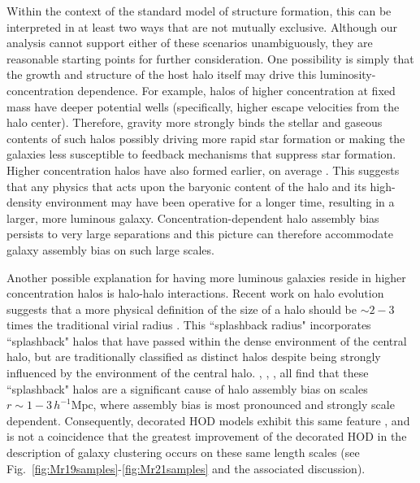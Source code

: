 \documentclass[usenatbib,usegraphicx,letterpaper]{mn2e}
\begin{document}
Within the context of the standard model of structure formation, this
can be interpreted in at least two ways that are not mutually
exclusive. Although our analysis cannot support either of these
scenarios unambiguously, they are reasonable starting points for
further consideration.  One possibility is simply that the growth and
structure of the host halo itself may drive this
luminosity-concentration dependence. For example, halos of higher
concentration at fixed mass have deeper potential wells (specifically,
higher escape velocities from the halo center).  Therefore, gravity
more strongly binds the stellar and gaseous contents of such halos
possibly driving more rapid star formation or making the galaxies less
susceptible to feedback mechanisms that suppress star
formation. Higher concentration halos have also formed earlier, on
average \citep[e.g.,][]{wechsler02}. This suggests that any physics
that acts upon the baryonic content of the halo and its high-density
environment may have been operative for a longer time, resulting in a
larger, more luminous galaxy.  Concentration-dependent halo assembly
bias persists to very large separations 
\citep[$r > 10\, h^{-1}\mathrm{Mpc}$, e.g.,][]{wechsler06} and this picture can
therefore accommodate galaxy assembly bias on such large scales.

Another possible explanation for having more luminous galaxies reside
in higher concentration halos is halo-halo interactions.  Recent work
on halo evolution suggests that a more physical definition of the size
of a halo should be $\sim 2-3$ times the traditional virial radius
\citep{wetzel_etal14,adhikari_etal14,wetzel_nagai15,more_etal15,sunayama_etal16}.
This ``splashback radius" incorporates ``splashback" halos that have
passed within the dense environment of the central halo, but are
traditionally classified as distinct halos despite being strongly
influenced by the environment of the central
halo. \citet{wang_etal09}, \citet{wetzel_etal14},
\citet{sunayama_etal16}, all find that these ``splashback" halos are a
significant cause of halo assembly bias on scales $r \sim 1-3\,
h^{-1}\mathrm{Mpc}$, where assembly bias is most pronounced and
strongly scale dependent. Consequently, decorated HOD models exhibit
this same feature \citep{hearin_etal16}, and is not a coincidence that
the greatest improvement of the decorated HOD in the description of
galaxy clustering occurs on these same length scales (see
Fig.~\ref{fig:Mr19samples}-\ref{fig:Mr21samples} and the associated
discussion).
\end{document}

